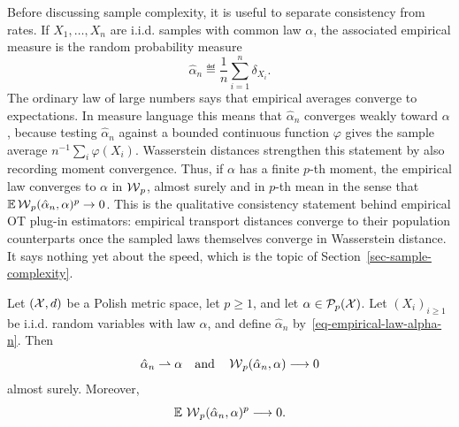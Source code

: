 Before discussing sample complexity, it is useful to separate consistency from rates.  If \(X_1,\ldots,X_n\) are i.i.d. samples with common law \(\alpha\), the associated empirical measure is the random probability measure
\begin{equation}\label{eq-empirical-law-alpha-n}
	\hat\alpha_n \eqdef \frac1n\sum_{i=1}^n\delta_{X_i}.
\end{equation}
The ordinary law of large numbers says that empirical averages converge to expectations.  In measure language this means that \(\hat\alpha_n\) converges weakly toward \(\alpha\), because testing \(\hat\alpha_n\) against a bounded continuous function \(\varphi\) gives the sample average \(n^{-1}\sum_i\varphi(X_i)\).  Wasserstein distances strengthen this statement by also recording moment convergence.  Thus, if \(\alpha\) has a finite \(p\)-th moment, the empirical law converges to \(\alpha\) in \(\operatorname{\mathcal{W}}_p\), almost surely and in \(p\)-th mean in the sense that \(\mathbb{E}\operatorname{\mathcal{W}}_p(\hat\alpha_n,\alpha)^p\to0\).  This is the qualitative consistency statement behind empirical OT plug-in estimators: empirical transport distances converge to their population counterparts once the sampled laws themselves converge in Wasserstein distance.  It says nothing yet about the speed, which is the topic of Section~\ref{sec-sample-complexity}.

\begin{prop}\label{prop-empirical-lln-wasserstein}
	Let \((\mathcal{X},d)\) be a Polish metric space, let \(p\geq1\), and let \(\alpha\in\mathcal{P}_p(\mathcal{X})\).  Let \((X_i)_{i\geq1}\) be i.i.d. random variables with law \(\alpha\), and define \(\hat\alpha_n\) by~\eqref{eq-empirical-law-alpha-n}.  Then
	\[
		\hat\alpha_n\rightharpoonup\alpha
		\quad \text{and} \quad
		\operatorname{\mathcal{W}}_p(\hat\alpha_n,\alpha)\longrightarrow0
	\]
	almost surely.  Moreover,
	\[
		\mathbb{E}\,\operatorname{\mathcal{W}}_p(\hat\alpha_n,\alpha)^p\longrightarrow0.
	\]
\end{prop}


